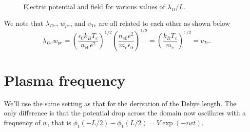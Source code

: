 \documentclass[a4paper,11pt]{report}
\begin{document}
\begin{figure}
\begin{subfigure}[b]{0.45\textwidth}
        \caption{}
        \label{fig:debye_elec}
    \end{subfigure}
    \caption{Electric potential and field for various values of $\lambda_D/L$.}
    \label{fig:debye_phi_elec}
\end{figure}

We note that $\lambda_{De}$,  $w_{pe}$, and $v_{Te}$ are all related to each other as shown below
\begin{equation}
    \label{eq:debye_3vars}
    \lambda_{De} w_{pe} = \left ( \frac{\epsilon_0 k_B T_e}{n_{e0} e^2} \right )^{1/2} \left ( \frac{n_{e0} e^2}{m_e \epsilon_0} \right )^{1/2} = \left ( \frac{k_B T_e}{m_e} \right )^{1/2} = v_{Te}.
\end{equation}

\section{Plasma frequency}
We'll use the same setting as that for the derivation of the Debye length. The only difference is that the potential drop across the domain now oscillates with a frequency of $w$, that is $\phi_1(-L/2) - \phi_1(L/2) = V \exp (-iwt)$.
\end{document}
